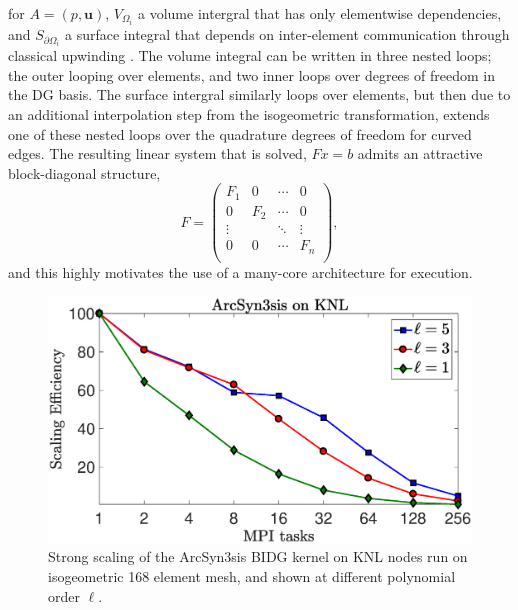 for $A = (p,\boldsymbol{u})$, $V_{\Omega_{i}}$ a volume intergral that has only
elementwise dependencies, and $S_{\partial\Omega_{i}}$ a surface integral that
depends on inter-element communication through classical upwinding
\cite{Michoski2014898}.  The volume integral can be written in three nested
loops; the outer looping over elements, and two inner loops over degrees of
freedom in the DG basis.  The surface intergral similarly loops over elements,
but then due to an additional interpolation step from the isogeometric
transformation, extends one of these nested loops over the quadrature degrees
of freedom for curved edges.  The resulting linear system that is solved,
$Fx = b$ admits an attractive block-diagonal structure,
\begin{equation}
  F = \begin{pmatrix}
    F_1 & 0 & \cdots & 0 \\
    0 & F_2 & \cdots & 0 \\
    \vdots & & \ddots & \vdots \\
    0 & 0 & \cdots & F_n \\
  \end{pmatrix},
\end{equation}
and this highly motivates the use of a many-core architecture for execution.

\begin{figure}
\begin{center}
\includegraphics[width=0.99\linewidth]{./bidg_data/2nd_try/scaling}
\end{center}
\vspace*{-.5cm}
\caption{Strong scaling of the ArcSyn3sis BIDG kernel on KNL nodes run on
isogeometric 168 element mesh, and shown at different polynomial order $\ell$.}
\label{fig:bidg_scaling}
\end{figure}

